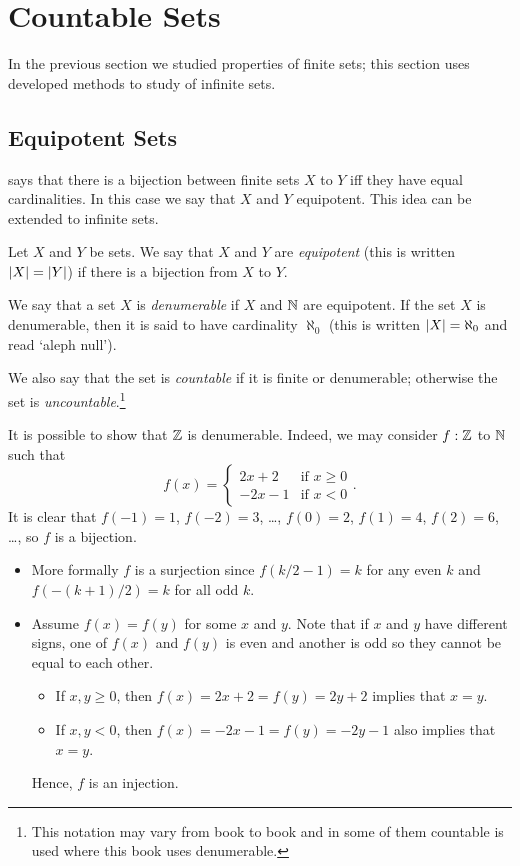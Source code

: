\chapter{Countable Sets}
In the previous section we studied properties of finite sets; this section
uses developed methods to study of infinite sets.

\section{Equipotent Sets}

 says that there is a bijection between
finite sets $X$ to $Y$ iff they have equal cardinalities. In this case we say
that $X$ and $Y$ equipotent.
This idea can be extended to infinite sets.
\begin{definition}
  Let $X$ and $Y$ be sets. We say that $X$ and $Y$ are \emph{equipotent} (this
  is written $\left|{X}\right| = \left|{Y}\right|$) if there is a bijection from
  $X$ to $Y$.

  We say that a set $X$ is \emph{denumerable} if $X$ and ${\mathbb{N}}$ are equipotent.
  If the set $X$ is denumerable, then it is said to have cardinality $\aleph_0$
  (this is written $\left|{X}\right| = \aleph_0$ and read `aleph null').

  We also say that the set is \emph{countable} if it is finite or denumerable;
  otherwise the set is \emph{uncountable}.\footnote{%
    This notation may vary from book to book and in some of them countable is
    used where this book uses denumerable.
  }
\end{definition}

It is possible to show that ${\mathbb{Z}}$ is denumerable. Indeed, we may consider $f :
{\mathbb{Z}}$ to ${\mathbb{N}}$ such that 
\[
  f(x) = 
  \begin{cases}
    2x + 2 & \text{if } x \ge 0 \\
    -2x - 1 & \text{if } x < 0
  \end{cases}.
\]
It is clear that $f(-1) = 1$, $f(-2) = 3$, \dots, $f(0) = 2$, $f(1) = 4$, $f(2)
= 6$, \dots, so $f$ is a bijection.
\begin{itemize}
  \item More formally $f$ is a surjection since $f(k / 2 - 1) = k$ for any even
    $k$ and $f(-(k + 1) / 2) = k$ for all odd $k$.
  \item Assume $f(x) = f(y)$ for some $x$ and $y$. Note that if $x$ and
    $y$ have different signs, one of $f(x)$ and $f(y)$ is even and another is
    odd so they cannot be equal to each other.
    \begin{itemize}
      \item If $x, y \ge 0$, then $f(x) = 2x + 2 = f(y) = 2y + 2$ implies that
        $x = y$.
      \item If $x, y < 0$, then $f(x) = -2x - 1= f(y) = -2y - 1$ also implies
        that $x = y$.
    \end{itemize}
    Hence, $f$ is an injection.
\end{itemize}

